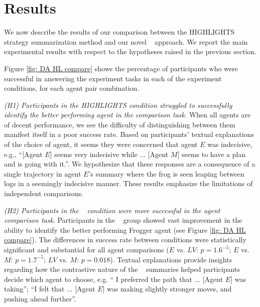 \section{Results}
We now describe the results of our comparison between the HIGHLIGHTS strategy summarization method and our novel \disalg~ approach. We report the main experimental results with respect to the hypotheses raised in the previous section. 

Figure \ref{fig: DA HL compare} shows the percentage of participants who were successful in answering the experiment tasks in each of the experiment conditions, for each agent pair combination.

\emph{(H1) Participants in the HIGHLIGHTS condition struggled to successfully identify the better
performing agent in the comparison task.} When all agents are of decent performance, we see the difficulty
of distinguishing between them manifest itself in a poor success rate.
Based on participants' textual explanations of the choice of agent, it seems they were concerned that agent $E$ was indecisive, e.g., ``[Agent $E$] seems very indecisive while ... [Agent $M$] seems to have a plan and is going with it.''. %
We hypothesize that these responses are a consequence of a single trajectory in agent $E$'s summary where the frog is seen leaping between logs in a seemingly indecisive manner. These results emphasize the limitations of independent comparisons.



\emph{(H2) Participants in the \disalg~ condition were more successful in the agent comparison
task}. Participants in the \disalg~ group 
showed vast improvement
in the ability to identify the better performing Frogger agent  (see Figure \ref{fig: DA HL compare}). The differences in success rate between conditions  were statistically significant and  
substantial for all agent comparisons ($E$ vs. $LV$: $p = 1.6^{-5}$; $E$ vs. $M$: $p = 1.7^{-5}$; $LV$ vs. $M$: $p = 0.018$). Textual explanations provide insights regarding how the
contrastive nature of the \disalg~ summaries helped participants decide which agent to choose, e.g. `` I preferred the path that ... [Agent $E$] was taking''; ``I felt that ... [Agent $E$] was making slightly stronger moves, and pushing ahead further''.



